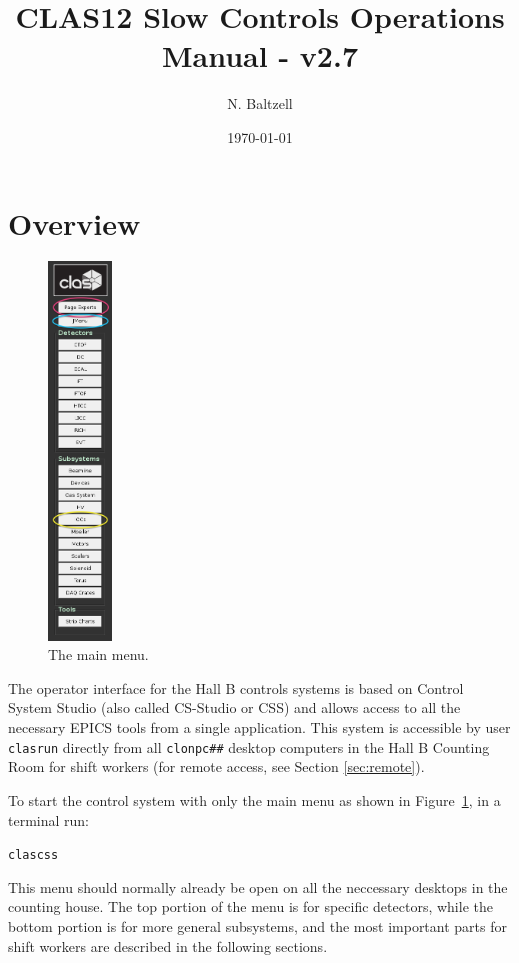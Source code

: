 \documentclass[amsmath,amssymb,notitlepage,11pt]{revtex4}
\begin{document}
\title{CLAS12 Slow Controls Operations Manual - v2.7}
\author{N. Baltzell}
\date{\today}
\begin{abstract}
\end{abstract}

\maketitle
\tableofcontents
\newpage

\section{Overview}

\begin{figure}\centering\vspace{1cm}
  \includegraphics[width=0.15\textwidth]{pics/mainmenu}
  \caption{The main menu.\label{fig:mainmenu}}
\end{figure}

The operator interface for the Hall B controls systems is based on Control System Studio (also called CS-Studio or CSS) and allows access to all the necessary EPICS tools from a single application.  This system is accessible by user \texttt{clasrun} directly from all \texttt{clonpc\#\#} desktop computers in the Hall B Counting Room for shift workers (for remote access, see Section \ref{sec:remote}).


To start the control system with only the main menu as shown in Figure~\ref{fig:mainmenu}, in a terminal run: \begin{center}\texttt{clascss}\end{center}  This menu should normally already be open on all the neccessary desktops in the counting house.  The top portion of the menu is for specific detectors, while the bottom portion is for more general subsystems, and the most important parts for shift workers are described in the following sections.
\end{document}

